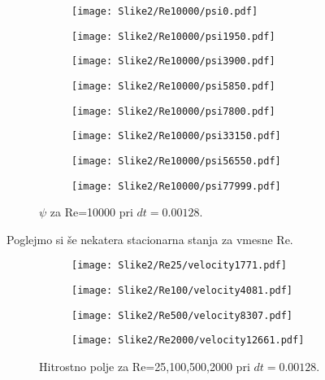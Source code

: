 \documentclass[12pt,a4paper]{article}
\begin{document}
\begin{figure}[H]
    \centering
    \begin{subfigure}[b]{0.2\textwidth}  			
        \texttt{[image: Slike2/Re10000/psi0.pdf]}
    \end{subfigure}
    \begin{subfigure}[b]{0.2\textwidth}  			
        \texttt{[image: Slike2/Re10000/psi1950.pdf]}
    \end{subfigure}
    \begin{subfigure}[b]{0.2\textwidth}  			
        \texttt{[image: Slike2/Re10000/psi3900.pdf]}
    \end{subfigure}
        \begin{subfigure}[b]{0.2\textwidth}  			
        \texttt{[image: Slike2/Re10000/psi5850.pdf]}
    \end{subfigure}
 
     \begin{subfigure}[b]{0.2\textwidth}  			
        \texttt{[image: Slike2/Re10000/psi7800.pdf]}
    \end{subfigure}
        \begin{subfigure}[b]{0.2\textwidth}  			
        \texttt{[image: Slike2/Re10000/psi33150.pdf]}
    \end{subfigure}
        \begin{subfigure}[b]{0.2\textwidth}  			
        \texttt{[image: Slike2/Re10000/psi56550.pdf]}
    \end{subfigure}
        \begin{subfigure}[b]{0.2\textwidth}  			
        \texttt{[image: Slike2/Re10000/psi77999.pdf]}
    \end{subfigure}
    \caption{$\psi$ za Re=10000 pri $dt=0.00128$.} \label{fig:slika9}
\end{figure}

Poglejmo si še nekatera stacionarna stanja za vmesne Re.

\begin{figure}[H]
    \centering
    \begin{subfigure}[b]{0.2\textwidth}  			
        \texttt{[image: Slike2/Re25/velocity1771.pdf]}
    \end{subfigure}
    \begin{subfigure}[b]{0.2\textwidth}  			
        \texttt{[image: Slike2/Re100/velocity4081.pdf]}
    \end{subfigure}
    \begin{subfigure}[b]{0.2\textwidth}  			
        \texttt{[image: Slike2/Re500/velocity8307.pdf]}
    \end{subfigure}
        \begin{subfigure}[b]{0.2\textwidth}  			
        \texttt{[image: Slike2/Re2000/velocity12661.pdf]}
    \end{subfigure}
    \caption{Hitrostno polje za Re={25,100,500,2000} pri $dt=0.00128$.} \label{fig:slika10}
\end{figure}
\end{document}
